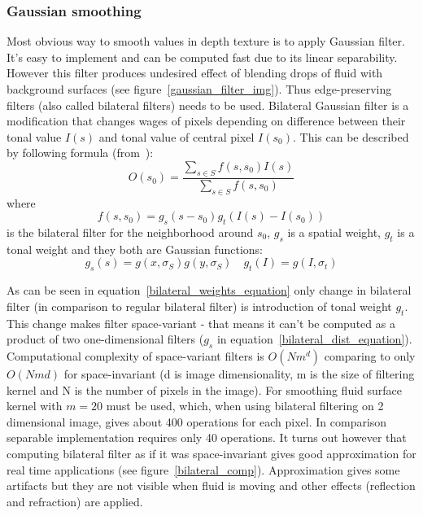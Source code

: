 \subsubsection{Gaussian smoothing} \label{sec:gaussiansmoothing}
Most obvious way to smooth values in depth texture is to apply Gaussian filter. It's easy to implement and can be computed fast due to its linear separability. However this filter produces undesired effect of blending drops of fluid with background surfaces (see figure~\ref{gaussian_filter_img}). 
Thus edge-preserving filters (also called bilateral filters) needs to be used. Bilateral Gaussian filter is a modification that changes wages of pixels depending on difference between their tonal value $I(s)$ and tonal value of central pixel $I(s_0)$. This can be described by following formula (from~\cite{PhamVliet2005}): 
\begin{equation}
\label{bilateral_equation}
O(s_0) = \frac{\sum_{s \in S}f(s, s_0)I(s)}{\sum_{s \in S}f(s, s_0)}
\end{equation}
where 
\begin{equation}
\label{bilateral_weights_equation}
f(s, s_0) = g_s(s-s_0)g_t(I(s)-I(s_0))
\end{equation}
is the bilateral filter for the neighborhood around $s_0$, $g_s$ is a spatial weight, $g_t$ is a tonal weight and they both are Gaussian functions:
\begin{equation}
\label{bilateral_dist_equation}
g_s(s) = g(x, \sigma_S)g(y, \sigma_S)  \quad   g_t(I) = g(I, \sigma_t)
\end{equation}

As can be seen in equation~\ref{bilateral_weights_equation} only change in bilateral filter (in comparison to regular bilateral filter) is introduction of tonal weight $g_t$. This change makes filter space-variant - that means it can't be computed as a product of two one-dimensional filters ($g_s$ in equation~\ref{bilateral_dist_equation}). 
Computational complexity of space-variant filters is $O(Nm^d)$ comparing to only $O(Nmd)$ for space-invariant (d is image dimensionality, m is the size of filtering kernel and N is the number of pixels in the image). For smoothing fluid surface kernel with $m = 20$ must be used, which, when using bilateral filtering on 2 dimensional image, gives about 400 operations for each pixel. In comparison separable implementation requires only 40 operations. It turns out however that computing bilateral filter as if it was space-invariant gives good approximation for real time applications (see figure~\ref{bilateral_comp}). Approximation gives some artifacts but they are not visible when fluid is moving and other effects (reflection and refraction) are applied.

